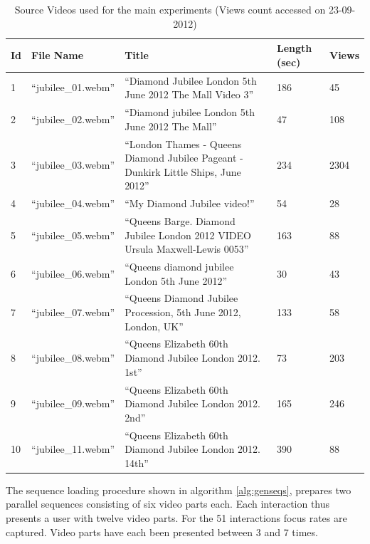 \begin{table}
   \begin{tabular}{ | l | l | p{8cm} | p{1.3cm} | l |}
     \hline
     \textbf{Id} & \textbf{File Name}	          & \textbf{Title}	  & \textbf{Length (sec)} & \textbf{Views} \\ \hline
     1	 & ``jubilee\_01.webm''	& ``Diamond Jubilee London 5th June 2012 The Mall Video 3'' & 186                             & 45   \\ \hline
     2	 & ``jubilee\_02.webm''	& ``Diamond jubilee London 5th June 2012 The Mall'' & 47                                      & 108  \\ \hline
     3	 & ``jubilee\_03.webm''	& ``London Thames - Queens Diamond Jubilee Pageant - Dunkirk Little Ships, June 2012'' & 234  & 2304\\ \hline
     4	 & ``jubilee\_04.webm''	& ``My Diamond Jubilee video!'' & 54                                                          & 28   \\ \hline
     5	 & ``jubilee\_05.webm''	& ``Queens Barge. Diamond Jubilee London 2012 VIDEO Ursula Maxwell-Lewis 0053'' & 163         & 88   \\ \hline
     6	 & ``jubilee\_06.webm''	& ``Queens diamond jubilee London 5th June 2012'' & 30                                        & 43   \\ \hline
     7	 & ``jubilee\_07.webm''	& ``Queens Diamond Jubilee Procession, 5th June 2012, London, UK'' & 133                      & 58   \\ \hline
     8	 & ``jubilee\_08.webm''	& ``Queens Elizabeth 60th Diamond Jubilee London 2012. 1st'' & 73                             & 203  \\ \hline
     9	 & ``jubilee\_09.webm''	& ``Queens Elizabeth 60th Diamond Jubilee London 2012. 2nd'' & 165                            & 246  \\ \hline
     10 & ``jubilee\_11.webm''	& ``Queens Elizabeth 60th Diamond Jubilee London 2012. 14th'' & 390                           & 88   \\ \hline
   \end{tabular}
   \caption{Source Videos used for the main experiments (Views count accessed on 23-09-2012)}
   \label{videos}
\end{table}

The sequence loading procedure shown in algorithm \ref{alg:genseqs}, prepares two parallel sequences consisting of six video parts each. Each interaction thus presents a user with twelve video parts. For the 51 interactions focus rates are captured. Video parts have each been presented between 3 and 7 times. 

